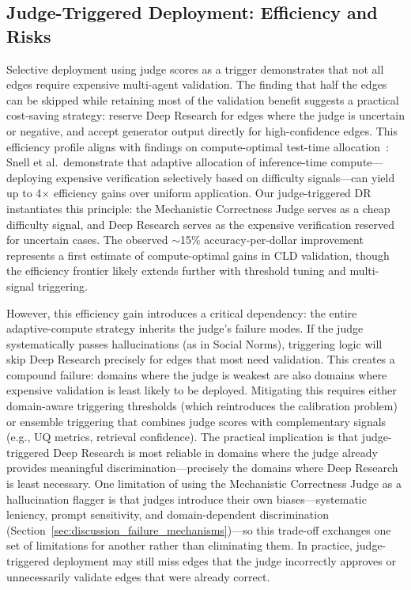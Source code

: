 \subsection{Judge-Triggered Deployment: Efficiency and Risks}

Selective deployment using judge scores as a trigger demonstrates that not all edges require expensive multi-agent validation. The finding that half the edges can be skipped while retaining most of the validation benefit suggests a practical cost-saving strategy: reserve Deep Research for edges where the judge is uncertain or negative, and accept generator output directly for high-confidence edges. This efficiency profile aligns with findings on compute-optimal test-time allocation~\citep{snell2024scalingllmtesttimecompute}: Snell et al.\ demonstrate that adaptive allocation of inference-time compute---deploying expensive verification selectively based on difficulty signals---can yield up to 4$\times$ efficiency gains over uniform application. Our judge-triggered DR instantiates this principle: the Mechanistic Correctness Judge serves as a cheap difficulty signal, and Deep Research serves as the expensive verification reserved for uncertain cases. The observed $\sim$15\% accuracy-per-dollar improvement represents a first estimate of compute-optimal gains in CLD validation, though the efficiency frontier likely extends further with threshold tuning and multi-signal triggering.

However, this efficiency gain introduces a critical dependency: the entire adaptive-compute strategy inherits the judge's failure modes. If the judge systematically passes hallucinations (as in Social Norms), triggering logic will skip Deep Research precisely for edges that most need validation. This creates a compound failure: domains where the judge is weakest are also domains where expensive validation is least likely to be deployed. Mitigating this requires either domain-aware triggering thresholds (which reintroduces the calibration problem) or ensemble triggering that combines judge scores with complementary signals (e.g., UQ metrics, retrieval confidence). The practical implication is that judge-triggered Deep Research is most reliable in domains where the judge already provides meaningful discrimination---precisely the domains where Deep Research is least necessary. One limitation of using the Mechanistic Correctness Judge as a hallucination flagger is that judges introduce their own biases---systematic leniency, prompt sensitivity, and domain-dependent discrimination (Section~\ref{sec:discussion_failure_mechanisms})---so this trade-off exchanges one set of limitations for another rather than eliminating them. In practice, judge-triggered deployment may still miss edges that the judge incorrectly approves or unnecessarily validate edges that were already correct.

